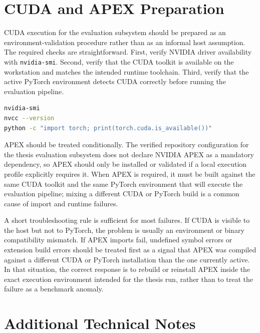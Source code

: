 \section{CUDA and APEX Preparation}

CUDA execution for the evaluation subsystem should be prepared as an environment-validation procedure rather than as an informal host assumption. The required checks are straightforward. First, verify NVIDIA driver availability with \texttt{nvidia-smi}. Second, verify that the CUDA toolkit is available on the workstation and matches the intended runtime toolchain. Third, verify that the active PyTorch environment detects CUDA correctly before running the evaluation pipeline.

\begin{lstlisting}[language=bash,caption={Minimal CUDA environment validation sequence.}]
nvidia-smi
nvcc --version
python -c "import torch; print(torch.cuda.is_available())"
\end{lstlisting}

APEX should be treated conditionally. The verified repository configuration for the thesis evaluation subsystem does not declare NVIDIA APEX as a mandatory dependency, so APEX should only be installed or validated if a local execution profile explicitly requires it. When APEX is required, it must be built against the same CUDA toolkit and the same PyTorch environment that will execute the evaluation pipeline; mixing a different CUDA or PyTorch build is a common cause of import and runtime failures.

A short troubleshooting rule is sufficient for most failures. If CUDA is visible to the host but not to PyTorch, the problem is usually an environment or binary compatibility mismatch. If APEX imports fail, undefined symbol errors or extension build errors should be treated first as a signal that APEX was compiled against a different CUDA or PyTorch installation than the one currently active. In that situation, the correct response is to rebuild or reinstall APEX inside the exact execution environment intended for the thesis run, rather than to treat the failure as a benchmark anomaly.

\section{Additional Technical Notes}

